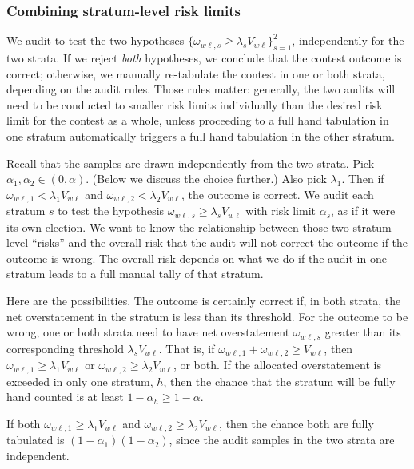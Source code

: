 \subsubsection{Combining stratum-level risk limits}\label{sec:stratumRisk}
We audit to test the two hypotheses $\{\omega_{w\ell,s} \ge \lambda_s V_{w\ell}\}_{s=1}^2$, 
independently for the two strata.
If we reject \emph{both} hypotheses, we conclude that the contest outcome is correct;
otherwise, we manually re-tabulate the contest in one or both strata, depending on the
audit rules.
Those rules matter:
generally, the two audits will need to be conducted to smaller risk limits individually than the desired
risk limit for the contest as a whole, unless proceeding to a full hand tabulation in one stratum
automatically triggers a full hand tabulation in the other stratum.

Recall that the samples are drawn independently from the two strata.
Pick $\alpha_1, \alpha_2 \in (0,\alpha)$.
(Below we discuss the choice further.)
Also pick $\lambda_1$.
Then if $\omega_{w\ell,1} < \lambda_1 V_{w\ell}$ and 
$\omega_{w\ell,2} < \lambda_2 V_{w\ell}$,
the outcome is correct.
We audit each stratum $s$ to test the hypothesis $\omega_{w\ell,s} \ge \lambda_s V_{w\ell}$ 
with risk limit $\alpha_s$,
as if it were its own election.
We want to know the relationship between those two stratum-level ``risks'' and the 
overall risk that the audit will not correct the outcome if the outcome is wrong.
The overall risk depends on what we do if the audit in one stratum leads to a full manual
tally of that stratum.

Here are the possibilities.
The outcome is certainly correct if, in both strata, the net overstatement in the stratum is less
than its threshold. 
For the outcome to be wrong, one or both strata need to have net overstatement
$\omega_{w\ell,s}$
greater than its corresponding threshold $\lambda_s V_{w\ell}$.
That is, if $\omega_{w\ell,1} + \omega_{w\ell,2} \ge V_{w\ell}$, then $\omega_{w\ell,1}\ge \lambda_1V_{w\ell}$
or $\omega_{w\ell,2}\ge \lambda_2V_{w\ell}$, or both.
If the allocated overstatement is exceeded in only one stratum, $h$, then the chance that the 
stratum will be fully hand counted is at least $1-\alpha_h \ge 1- \alpha$.

If both $\omega_{w\ell,1} \ge \lambda_1V_{w\ell}$
and $\omega_{w\ell,2} \ge \lambda_2V_{w\ell}$, then the chance both are fully tabulated is
$(1-\alpha_1)(1-\alpha_2)$, since the audit samples in the two strata are independent.

